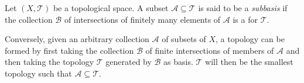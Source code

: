 \documentclass{article}
\begin{document}
Let $(X,\mathcal{T})$ be a topological space.  A subset $\mathcal{A}\subseteq\mathcal{T}$ is said to be a \emph{subbasis} if the collection $\mathcal{B}$ of intersections of finitely many elements of $\mathcal{A}$ is a  for $\mathcal{T}$.

Conversely, given an arbitrary collection $\mathcal{A}$ of subsets of $X$, a topology can be formed by first taking the collection $\mathcal{B}$ of finite intersections of members of $\mathcal{A}$ and then taking the topology $\mathcal{T}$ generated by $\mathcal{B}$ as basis.  $\mathcal{T}$ will then be the smallest topology such that $\mathcal{A}\subseteq\mathcal{T}$.
\end{document}
